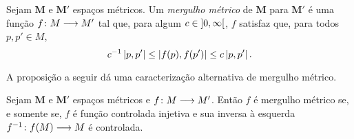 \begin{definition}
Sejam $\bm M$ e $\bm M'$ espaços métricos. Um \emph{mergulho métrico} de $\bm M$ para $\bm M'$ é uma função ${f}\colon {M} \longrightarrow {M'}$ tal que, para algum $c \in \left]{0},{\infty}\right[$, $f$ satisfaz que, para todos $p,p' \in M$,
	\begin{equation*}
	c^{-1} \left\vert{p},{p'}\right\vert \leq \left\vert{f(p)},{f(p')}\right\vert \leq c\left\vert{p},{p'}\right\vert.
	\end{equation*}
\end{definition}

A proposição a seguir dá uma caracterização alternativa de mergulho métrico.

\begin{proposition}
\label{prop:mergulho.metrico}
Sejam $\bm M$ e $\bm M'$ espaços métricos e ${f}\colon {M} \longrightarrow {M'}$. Então $f$ é mergulho métrico se, e somente se, $f$ é função controlada injetiva e sua inversa à esquerda ${f^{-1}}\colon {f(M)} \longrightarrow {M}$ é controlada.
\end{proposition}
